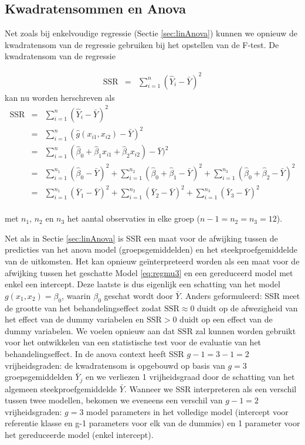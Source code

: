\documentclass[
  12pt,dutch,coursenotes]{book}
\theoremstyle{definition}
\theoremstyle{definition}
\theoremstyle{definition}
\theoremstyle{definition}
\theoremstyle{remark}
\begin{document}
\hypertarget{kwadratensommen-en-anova}{%
\subsection{Kwadratensommen en Anova}\label{kwadratensommen-en-anova}}

Net zoals bij enkelvoudige regressie (Sectie \ref{sec:linAnova}) kunnen we opnieuw de kwadratensom van de regressie gebruiken bij het opstellen van de F-test.
De kwadratensom van de regressie

\begin{eqnarray*}
\text{SSR}&=&\sum\limits_{i=1}^n (\hat Y_{i} -\bar Y)^2
\end{eqnarray*}
kan nu worden herschreven als
\begin{eqnarray*}
\text{SSR}&=&\sum\limits_{i=1}^n (\hat Y_i -\bar Y)^2\\
&=& \sum\limits_{i=1}^n (\hat{g} (x_{i1},x_{i2}) - \bar Y)^2\\
&=& \sum\limits_{i=1}^n (\hat\beta_0+\hat\beta_1x_{i1}+\hat\beta_2x_{i2}) - \bar Y)^2\\
&=& \sum\limits_{i=1}^{n_1} (\hat\beta_0 - \bar Y)^2 +\sum\limits_{i=1}^{n_2} (\hat\beta_0 + \hat\beta_1 - \bar Y)^2+\sum\limits_{i=1}^{n_3} (\hat\beta_0 + \hat\beta_2 - \bar Y)^2\\
&=& \sum\limits_{i=1}^{n_1} (\bar Y_1- \bar Y)^2 +\sum\limits_{i=1}^{n_2} (\bar Y_2- \bar Y)^2+\sum\limits_{i=1}^{n_3} (\bar Y_3 - \bar Y)^2\\
\end{eqnarray*}

met \(n_1\), \(n_2\) en \(n_3\) het aantal observaties in elke groep (\(n-1=n_2=n_3=12\)).

Net als in Sectie \ref{sec:linAnova} is SSR een maat voor de afwijking tussen de predicties van het anova model (groepsgemiddelden) en het steekproefgemiddelde van de uitkomsten.
Het kan opnieuw geïnterpreteerd worden als een maat voor de afwijking tussen het geschatte Model \eqref{eq:regmu3} en een gereduceerd model met enkel een intercept.
Deze laatste is dus eigenlijk een schatting van het model \(g(x_1,x_2)=\beta_0\), waarin \(\beta_0\) geschat wordt door \(\bar{Y}\).
Anders geformuleerd: SSR meet de grootte van het behandelingseffect zodat \(\text{SSR} \approx 0\) duidt op de afwezigheid van het effect van de dummy variabelen en \(\text{SSR}>0\) duidt op een effect van de dummy variabelen. We voelen opnieuw aan dat \(\text{SSR}\) zal kunnen worden gebruikt voor het ontwikkelen van een statistische test voor de evaluatie van het behandelingseffect.
In de anova context heeft SSR \(g-1=3-1=2\) vrijheidsgraden: de kwadratensom is opgebouwd op basis van \(g=3\) groepsgemiddelden \(\bar Y_j\) en we verliezen 1 vrijheidsgraad door de schatting van het algemeen steekproefgemiddelde \(\bar Y\).
Wanneer we SSR interpreteren als een verschil tussen twee modellen, bekomen we eveneens een verschil van \(g-1=2\) vrijheidsgraden: \(g=3\) model parameters in het volledige model (intercept voor referentie klasse en g-1 parameters voor elk van de dummies) en 1 parameter voor het gereduceerde model (enkel intercept).
\end{document}
